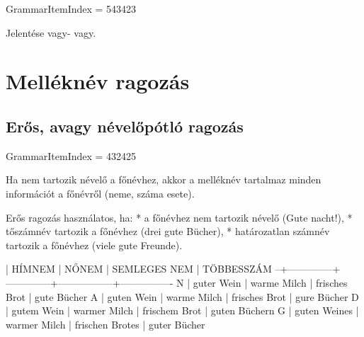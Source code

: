 \documentclass{article}
\newenvironment{desc}{\verbatim}{\endverbatim}
\begin{document}
GrammarItemIndex = 543423

\begin{desc}
Jelentése vagy- vagy.
\end{desc}

\section{Melléknév ragozás}

\subsection{Erős, avagy névelőpótló ragozás}

GrammarItemIndex = 432425

\begin{desc}
Ha nem tartozik névelő a főnévhez, akkor a melléknév tartalmaz minden információt a főnévről (neme, száma esete).

Erős ragozás használatos, ha:
* a főnévhez nem tartozik névelő (Gute nacht!),
* tőszámnév tartozik a főnévhez (drei gute Bücher),
* határozatlan számnév tartozik a főnévhez (viele gute Freunde).

  | HÍMNEM       | NŐNEM        | SEMLEGES NEM    | TÖBBESSZÁM
--+--------------+--------------+-----------------+----------------
N | guter Wein   | warme Milch  | frisches Brot   | gute Bücher
A | guten Wein   | warme Milch  | frisches Brot   | gure Bücher
D | gutem Wein   | warmer Milch | frischem Brot   | guten Büchern
G | guten Weines | warmer Milch | frischen Brotes | guter Bücher
\end{desc}
\end{document}
